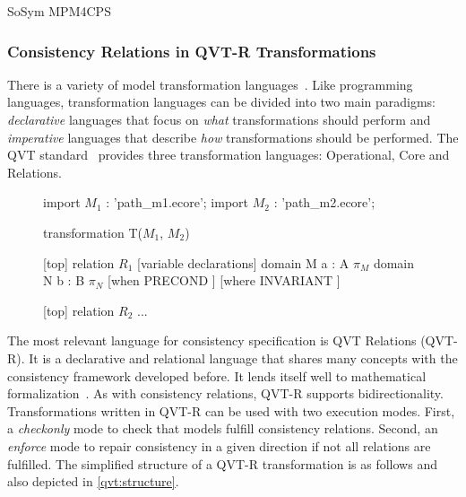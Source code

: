 \begin{copiedFrom}{SoSym MPM4CPS}
\subsubsection{Consistency Relations in QVT-R Transformations}

There is a variety of model transformation languages~\cite{czarnecki2003a}. Like programming languages, transformation languages can be divided into two main paradigms: \textit{declarative} languages that focus on \textit{what} transformations should perform and \textit{imperative} languages that describe \textit{how} transformations should be performed. The QVT standard~\cite{qvt} %
provides three transformation languages: Operational, Core and Relations.

\begin{figure}
\begin{embeddedqvtcode}[frame=bt, numbers=none, mathescape=true, caption={[Simplified structure of a QVT-R transformation]Simplified structure of a QVT-R transformation. Taken from \owncite{klare2020compatibility-report}.},label={qvt:structure},captionpos=b]
import $M_1$ : 'path_m1.ecore';
import $M_2$ : 'path_m2.ecore';

transformation T($M_1$, $M_2$) {
    [top] relation $R_1$ {
        [variable declarations]
        domain M a : A { $\pi_{M}$ }
        domain N b : B { $\pi_{N}$ }
        [when { PRECOND }] [where { INVARIANT }]
    }
    
    [top] relation $R_2$ { ... }
}
\end{embeddedqvtcode}
\end{figure}

The most relevant language for consistency specification is QVT Relations (QVT-R). It is a declarative and relational language that shares many concepts with the consistency framework developed before. It lends itself well to mathematical formalization~\cite{stevens2010sosym}. As with consistency relations, QVT-R supports bidirectionality. Transformations written in QVT-R can be used with two execution modes. First, a \textit{checkonly} mode to check that models fulfill consistency relations. Second, an \textit{enforce} mode to repair consistency in a given direction if not all relations are fulfilled. The simplified structure of a QVT-R transformation is as follows and also depicted in \autoref{qvt:structure}. 


\end{copiedFrom}
